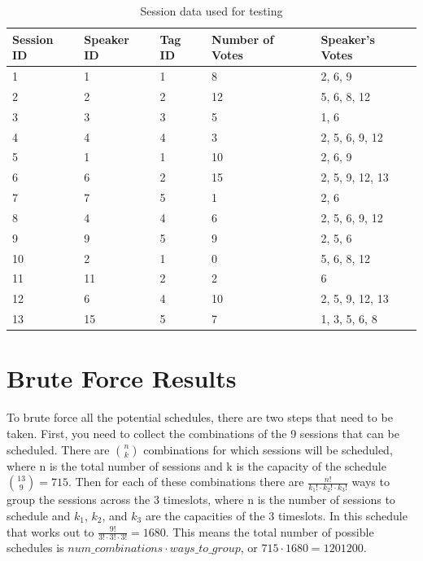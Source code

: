 \begin{table}[h]
\centering

\begin{tabular}{| l  |l  |l  |l  |l |}
\hline
Session ID& Speaker ID& Tag ID& Number of Votes& Speaker's Votes\\
\hline
1 & 1 & 1 & 8 & 2, 6, 9 \\\hline

2 & 2 & 2 & 12 & 5, 6, 8, 12 \\\hline

3 & 3 & 3 & 5 & 1, 6 \\\hline

4 & 4 & 4 & 3 & 2, 5, 6, 9, 12 \\\hline

5 & 1 & 1 & 10 & 2, 6, 9 \\\hline

6 & 6 & 2 & 15 & 2, 5, 9, 12, 13 \\\hline

7 & 7 & 5 & 1 & 2, 6 \\\hline

8 & 4 & 4 & 6 & 2, 5, 6, 9, 12 \\\hline

9 & 9 & 5 & 9 & 2, 5, 6 \\\hline

10 & 2 & 1 & 0 & 5, 6, 8, 12 \\\hline

11 & 11 & 2 & 2 & 6 \\\hline

12 & 6 & 4 & 10 & 2, 5, 9, 12, 13 \\\hline

13 & 15 & 5 & 7 & 1, 3, 5, 6, 8 \\
\hline

\end{tabular}
\caption{Session data used for testing}
\label{tab:session_data}
\end{table}

\section{Brute Force Results}
 To brute force all the potential schedules, there are two steps that need to be taken. First, you need to collect the combinations of the 9 sessions that can be scheduled. There are $\binom{n}{k}$ combinations for which sessions will be scheduled, where n is the total number of sessions and k is the capacity of the schedule $\binom{13}{9}=715$. Then for each of these combinations there are $\frac{n!}{k_1! \cdot k_2! \cdot k_3!}$ ways to group the sessions across the 3 timeslots, where n is the number of sessions to schedule and $k_1$, $k_2$, and $k_3$ are the capacities of the 3 timeslots. In this schedule that works out to $\frac{9!}{3! \cdot 3! \cdot 3!}=1680$. This means the total number of possible schedules is $num\_combinations \cdot ways\_to\_group$, or $715 \cdot 1680=1201200$.
 
